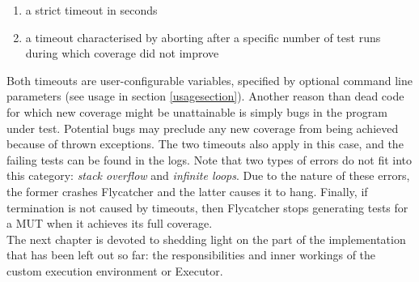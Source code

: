 \begin{enumerate}
   \item a strict timeout in seconds
   \item a timeout characterised by aborting after a specific number of test runs during which coverage did not improve
\end{enumerate}

Both timeouts are user-configurable variables, specified by optional command line parameters (see usage in section \ref{usagesection}). Another reason than dead code for which new coverage might be unattainable is simply bugs in the program under test. Potential bugs may preclude any new coverage from being achieved because of thrown exceptions. The two timeouts also apply in this case, and the failing tests can be found in the logs. Note that two types of errors do not fit into this category: \emph{stack overflow} and \emph{infinite loops}. Due to the nature of these errors, the former crashes \textsf{Flycatcher} and the latter causes it to hang. Finally, if termination is not caused by timeouts, then \textsf{Flycatcher} stops generating tests for a MUT when it achieves its full coverage.\\

The next chapter is devoted to shedding light on the part of the implementation that has been left out so far: the responsibilities and inner workings of the custom execution environment or \textsf{Executor}.